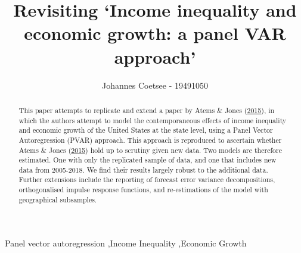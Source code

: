 \documentclass[11pt,preprint, authoryear]{elsarticle}
\numberwithin{equation}{section}
\numberwithin{figure}{section}
\numberwithin{table}{section}
\begin{document}
\begin{frontmatter}  %

\title{Revisiting `Income inequality and economic growth: a panel VAR approach'}





\author[Add1]{Johannes Coetsee - 19491050}





\address[Add1]{Stellenbosch University}


\begin{abstract}
\small{
This paper attempts to replicate and extend a paper by Atems \& Jones
(\protect\hyperlink{ref-atems}{2015}), in which the authors attempt to
model the contemporaneous effects of income inequality and economic
growth of the United States at the state level, using a Panel Vector
Autoregression (PVAR) approach. This approach is reproduced to ascertain
whether Atems \& Jones (\protect\hyperlink{ref-atems}{2015}) hold up to
scrutiny given new data. Two models are therefore estimated. One with
only the replicated sample of data, and one that includes new data from
2005-2018. We find their results largely robust to the additional data.
Further extensions include the reporting of forecast error variance
decompositions, orthogonalised impulse response functions, and
re-estimations of the model with geographical subsamples.
}
\end{abstract}

\vspace{1cm}

\begin{keyword}
\footnotesize{
Panel vector autoregression \sep Income Inequality \sep Economic Growth \\ \vspace{0.3cm}
\textit{} 
}
\end{keyword}
\vspace{0.5cm}
\end{frontmatter}



\pagestyle{fancy}
\chead{}
\lfoot{}
\lhead{}
\cfoot{}

\end{document}
